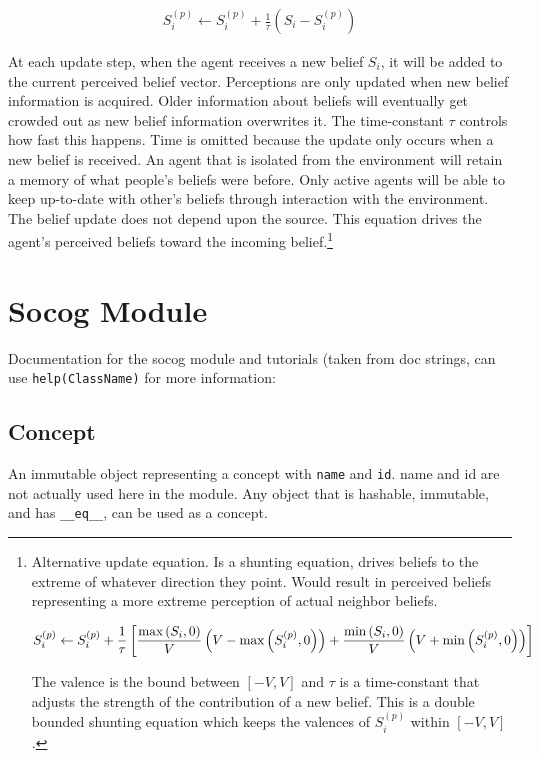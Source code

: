 \documentclass[11pt, a4paper]{article}
\begin{document}
\begin{eqnarray}
S_i^{(p)}\leftarrow S_i^{(p)} + \frac{1}{\tau}\left ( S_i -  S_i^{(p)} \right)
\end{eqnarray}

At each update step, when the agent receives a new belief $S_i$, it will be added to the current perceived belief vector. Perceptions are only updated when new belief information is acquired. Older information about beliefs will eventually get crowded out as new belief information overwrites it. The time-constant $\tau$ controls how fast this happens. Time is omitted because the update only occurs when a new belief is received. An agent that is isolated from the environment will retain a memory of what people's beliefs were before. Only active agents will be able to keep up-to-date with other's beliefs through interaction with the environment. The belief update does not depend upon the source. This equation drives the agent's perceived beliefs toward the incoming belief.\footnote{Alternative update equation. Is a shunting equation, drives beliefs to the extreme of whatever direction they point. Would result in perceived beliefs representing a more extreme perception of actual neighbor beliefs.

\begin{eqnarray}
S_i^{(p)}\leftarrow S_i^{(p)} + \frac{1}{\tau}\left [ \frac{\textup{max}\left( S_i,0 \right )}{V} \left( V - \textup{max}\left( S_i^{(p)},0\right ) \right ) + \frac{\textup{min}\left( S_i,0 \right )}{V} \left( V + \textup{min}\left( S_i^{(p)},0\right ) \right )\right ]
\end{eqnarray}

The valence is the bound between $[-V,V]$ and $\tau$ is a time-constant that adjusts the strength of the contribution of a new belief. This is a double bounded shunting equation which keeps the valences of $S_i^{(p)}$ within $[-V,V]$.}

\section{Socog Module}

Documentation for the socog module and tutorials (taken from doc strings, can use \texttt{help(ClassName)} for more information:

\subsection{Concept}
An immutable object representing a concept with \texttt{name} and \texttt{id}. name and id are not actually used here in the module. Any object that is hashable, immutable, and has \texttt{\_\_eq\_\_}, can be used as a concept.
\end{document}
